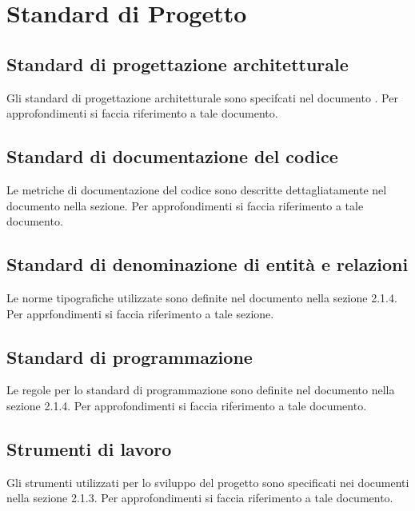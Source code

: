 \section{Standard di Progetto}
\label{sec:standardProgetto}

\subsection{Standard di progettazione architetturale}
\label{sub:Standard di progettazione architetturale}

Gli standard di progettazione architetturale sono specifcati nel documento \STdoc. Per approfondimenti si faccia riferimento a tale documento.

\subsection{Standard di documentazione del codice}
\label{sub:Standard di documentazione del codice}

Le metriche di documentazione del codice sono descritte dettagliatamente nel documento \PQdoc nella sezione. Per approfondimenti si faccia riferimento a tale documento.

\subsection{Standard di denominazione di entità e relazioni}
\label{sub:Standard di denominazione di entità e relazioni}

Le norme tipografiche utilizzate sono definite nel documento \NPdoc nella sezione 2.1.4. Per apprfondimenti si faccia riferimento a tale sezione.

\subsection{Standard di programmazione}
\label{sub:Standard di programmazione}

Le regole per lo standard di programmazione sono definite nel documento \NPdoc nella sezione 2.1.4. Per approfondimenti si faccia riferimento a tale documento.

\subsection{Strumenti di lavoro}
\label{sub:Strumenti di lavoro}

Gli strumenti utilizzati per lo sviluppo del progetto sono specificati nei documenti \NPdoc nella sezione 2.1.3. Per approfondimenti si faccia riferimento a tale documento.